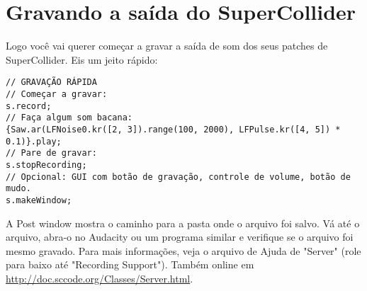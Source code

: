 \section{Gravando a saída do SuperCollider}

Logo você vai querer começar a gravar a saída de som dos seus patches de SuperCollider. Eis um jeito rápido:
 
\begin{lstlisting}[style=SuperCollider-IDE, basicstyle=\scttfamily\footnotesize]
// GRAVAÇÃO RÁPIDA
// Começar a gravar:
s.record;
// Faça algum som bacana:
{Saw.ar(LFNoise0.kr([2, 3]).range(100, 2000), LFPulse.kr([4, 5]) * 0.1)}.play;
// Pare de gravar:
s.stopRecording;
// Opcional: GUI com botão de gravação, controle de volume, botão de mudo.
s.makeWindow;
\end{lstlisting}
 
A Post window mostra o caminho para a pasta onde o arquivo foi salvo. Vá até o arquivo, abra-o no Audacity ou um programa similar e verifique se o arquivo foi mesmo gravado. Para mais informações, veja o arquivo de Ajuda de "Server" (role para baixo até "Recording Support"). Também online em \url{http://doc.sccode.org/Classes/Server.html}.
